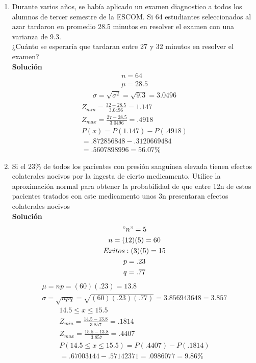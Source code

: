 \begin{enumerate}
    \item Durante varios años, se había aplicado un examen diagnostico a todos los alumnos de tercer semestre de la ESCOM. Si 64 estudiantes seleccionados al azar tardaron en promedio 28.5 minutos en resolver el examen con una varianza de 9.3.\\
    ¿Cuánto se esperaría que tardaran entre 27 y 32 minutos en resolver el examen?
    \\\textbf{Solución}
    \begin{gather*}
    n	= 64\\
    \mu = 28.5		 
    \end{gather*}
    \begin{gather*}
    \sigma = \sqrt{\sigma^{2}} = \sqrt{9.3} = 3.0496
    \end{gather*}
    \begin{gather*}	 
    Z_{min} = \frac{32 - 28.5}{3.0496} = 1.147\\
    Z_{max} = \frac{27 - 28.5}{3.0496} = .4918\\
    P(x) = P(1.147) - P(.4918)\\ = .872856848 - .3120669484\\ = .5607898996 = 56.07\%
    \end{gather*}
    \item Si el 23\% de todos los pacientes con presión sanguínea elevada tienen efectos colaterales nocivos por la ingesta de cierto medicamento. Utilice la aproximación normal para obtener la probabilidad de que entre 12n de estos pacientes tratados con este medicamento unos 3n presentaran efectos colaterales nocivos
    \\\textbf{Solución}
    \begin{gather*}
    "n" = 5\\
    n	= (12)(5) = 60\\
    Exitos : (3)(5) = 15\\
    p = .23\\
    q = .77	 
    \end{gather*}
    \begin{gather*}
    \mu = np = (60)(.23) = 13.8\\
    \sigma = \sqrt{npq} = \sqrt{(60)(.23)(.77)} = 3.856943648 = 3.857
    \end{gather*}
    \begin{gather*}	 
    14.5 \le x \le 15.5\\	
    Z_{min} = \frac{14.5 - 13.8}{3.857} = .1814\\
    Z_{max} = \frac{15.5 - 13.8}{3.857} = .4407\\
    P(14.5 \le x \le 15.5) =  P(.4407) - P(.1814)\\ = .67003144 - .57142371 = .0986077 = 9.86\%
    \end{gather*}
    
\end{enumerate}